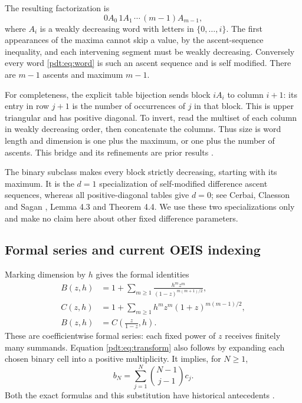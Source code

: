 The resulting factorization is
\begin{equation}\label{pdt:eq:word}
 0A_0\,1A_1\,\cdots\,(m-1)A_{m-1},
\end{equation}
where $A_i$ is a weakly decreasing word with letters in $\{0,\ldots,i\}$. The first appearances of the maxima cannot skip a value, by the ascent-sequence inequality, and each intervening segment must be weakly decreasing. Conversely every word \eqref{pdt:eq:word} is such an ascent sequence and is self modified. There are $m-1$ ascents and maximum $m-1$.

For completeness, the explicit table bijection sends block $iA_i$ to column $i+1$: its entry in row $j+1$ is the number of occurrences of $j$ in that block. This is upper triangular and has positive diagonal. To invert, read the multiset of each column in weakly decreasing order, then concatenate the columns. Thus size is word length and dimension is one plus the maximum, or one plus the number of ascents. This bridge and its refinements are prior results \cite{bcdk,dm}.

The binary subclass makes every block strictly decreasing, starting with its maximum. It is the $d=1$ specialization of self-modified difference ascent sequences, whereas all positive-diagonal tables give $d=0$; see Cerbai, Claesson and Sagan \cite{ccs}, Lemma 4.3 and Theorem 4.4. We use these two specializations only and make no claim here about other fixed difference parameters.

\subsection{Formal series and current OEIS indexing}
Marking dimension by $h$ gives the formal identities
\begin{align}
 B(z,h)&=1+\sum_{m\ge1}\frac{h^m z^m}{(1-z)^{m(m+1)/2}},\label{pdt:eq:B}\\
 C(z,h)&=1+\sum_{m\ge1}h^m z^m(1+z)^{m(m-1)/2},\label{pdt:eq:C}\\
 B(z,h)&=C\!\left(\frac z{1-z},h\right).\label{pdt:eq:transform}
\end{align}
These are coefficientwise formal series: each fixed power of $z$ receives finitely many summands. Equation \eqref{pdt:eq:transform} also follows by expanding each chosen binary cell into a positive multiplicity. It implies, for $N\ge1$,
\begin{equation}\label{pdt:eq:bin-transform}
 b_N=\sum_{j=1}^N\binom{N-1}{j-1}c_j.
\end{equation}
Both the exact formulas and this substitution have historical antecedents \cite{bek,khamis}.

